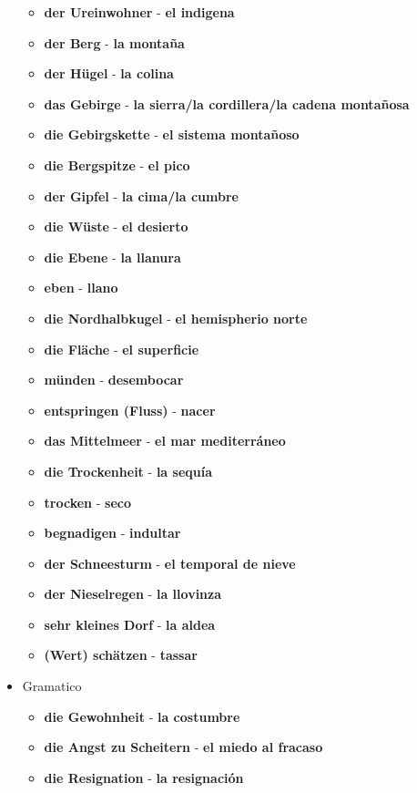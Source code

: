 \documentclass{article}
\begin{document}
\begin{multicols}{2}
\begin{itemize}
\begin{itemize}
			\item{\textbf{der Ureinwohner} - \textbf{el indigena}}
			\item{\textbf{der Berg} - \textbf{la montaña}}
			\item{\textbf{der Hügel} - \textbf{la colina}}
			\item{\textbf{das Gebirge} - \textbf{la sierra/la cordillera/la cadena montañosa}}
			\item{\textbf{die Gebirgskette} - \textbf{el sistema montañoso}}
			\item{\textbf{die Bergspitze} - \textbf{el pico}}
			\item{\textbf{der Gipfel} - \textbf{la cima/la cumbre}}
			\item{\textbf{die Wüste} - \textbf{el desierto}}
			\item{\textbf{die Ebene} - \textbf{la llanura}}
			\item{\textbf{eben} - \textbf{llano}}
			\item{\textbf{die Nordhalbkugel} - \textbf{el hemispherio norte}}
			\item{\textbf{die Fläche} - \textbf{el superficie}}
			\item{\textbf{münden} - \textbf{desembocar}}
			\item{\textbf{entspringen (Fluss)} - \textbf{nacer}}
			\item{\textbf{das Mittelmeer} - \textbf{el mar mediterráneo}}
			\item{\textbf{die Trockenheit} - \textbf{la sequía}}
			\item{\textbf{trocken} - \textbf{seco}}
			\item{\textbf{begnadigen} - \textbf{indultar}}
			\item{\textbf{der Schneesturm} - \textbf{el temporal de nieve}}
			\item{\textbf{der Nieselregen} - \textbf{la llovinza}}
			\item{\textbf{sehr kleines Dorf} - \textbf{la aldea}}
			\item{\textbf{(Wert) schätzen} - \textbf{tassar}}
		\end{itemize}
		\item{Gramatico}
		\begin{itemize}
			\item{\textbf{die Gewohnheit} - \textbf{la costumbre}}
			\item{\textbf{die Angst zu Scheitern} - \textbf{el miedo al fracaso}}
			\item{\textbf{die Resignation} - \textbf{la resignación}}

\end{itemize}
\end{itemize}
\end{multicols}
\end{document}
